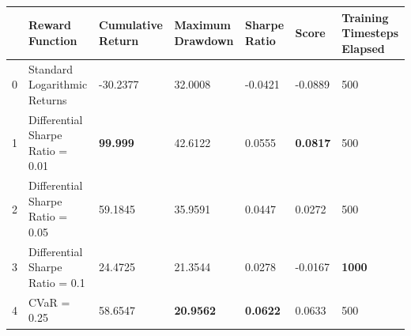 \begin{tabular}{lllllll}
\toprule
 & Reward Function & Cumulative Return & Maximum Drawdown & Sharpe Ratio & Score & Training Timesteps Elapsed \\
\midrule
0 & Standard Logarithmic Returns & -30.2377 & 32.0008 & -0.0421 & -0.0889 & 500 \\
1 & Differential Sharpe Ratio = 0.01 & \textbf{99.999} & 42.6122 & 0.0555 & \textbf{0.0817} & 500 \\
2 & Differential Sharpe Ratio = 0.05 & 59.1845 & 35.9591 & 0.0447 & 0.0272 & 500 \\
3 & Differential Sharpe Ratio = 0.1 & 24.4725 & 21.3544 & 0.0278 & -0.0167 & \textbf{1000} \\
4 & CVaR = 0.25 & 58.6547 & \textbf{20.9562} & \textbf{0.0622} & 0.0633 & 500 \\
\bottomrule
\end{tabular}
